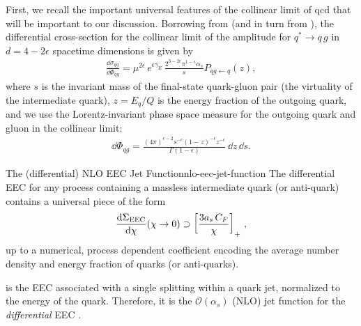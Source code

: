 First, we recall the important universal features of the collinear limit of \gls{qcd} that will be important to our discussion.
%
Borrowing from  (and in turn from \cite{Altarelli:1977zs,PhysRevD.9.980,PhysRevD.46.1980,Ritzmann:2014mka}), the differential cross-section for the collinear limit of the amplitude for \(q^* \to q\,g\) in \(d = 4 - 2\epsilon\) spacetime dimensions is given by
\begin{align}
    \label{eq:collinear_xsec}
    \frac{\dd \sigma_{qg}}{\dd \Phi_{qg}}
    =
    \mu^{2\epsilon}\,
    e^{\epsilon \gamma_E}
    \,
    \frac{2^{3-2\epsilon} \pi^{1-\epsilon}  \alpha_s}{s} P_{qg\leftarrow q}(z)
    ,
\end{align}
where \(s\) is the invariant mass of the final-state quark-gluon pair (the virtuality of the intermediate quark), \(z = E_q/Q\) is the energy fraction of the outgoing quark, and we use the Lorentz-invariant phase space measure for the outgoing quark and gluon in the collinear limit:
\begin{align}
    \label{eq:collinear_phase_space}
    \dd \Phi_{qg}
    =
    \frac{
        {(4\pi)}^{\epsilon-2}
        s^{-\epsilon}
        {(1-z)}^{-\epsilon} z^{-\epsilon}
    }
    {\Gamma(1-\epsilon)}
    \,
    \dd z \, \dd s
    .
\end{align}


\begin{proposition}{The (differential) NLO EEC Jet Function}{nlo-eec-jet-function}
The differential EEC for any process containing a massless intermediate quark (or anti-quark) contains a universal piece of the form
\begin{align}
    \label{eq:universal_differential_eec}
    \frac{\dd \Sigma_\text{EEC}}{\dd \chi}
    (\chi \to 0)
    \supset
    \le[
    \frac{3\ascf}{\chi}
    \ri]_+
    \,,
\end{align}
up to a numerical, process dependent coefficient encoding the average number density and energy fraction of quarks (or anti-quarks).

 is the EEC associated with a single splitting within a quark jet, normalized to the energy of the quark.
%
Therefore, it is the \(\mathcal{O}(\alpha_s)\) (NLO) jet function for the \textit{differential} EEC \cite{Dixon:2019uzg}.
\end{proposition}


